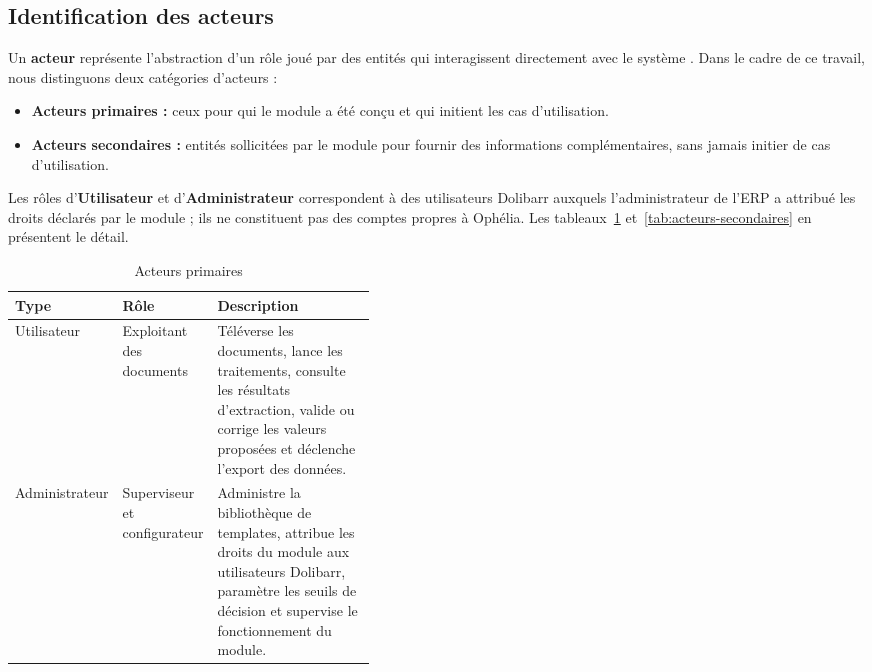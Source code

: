 \subsection{Identification des acteurs}
\label{subsec:acteurs}

Un \textbf{acteur} représente l'abstraction d'un rôle joué par des entités qui interagissent
directement avec le système \cite{roques2018uml}. Dans le cadre de ce travail, nous
distinguons deux catégories d'acteurs :

\begin{itemize}
    \item[\opmanicule] \textbf{Acteurs primaires :} ceux pour qui le module a été conçu et qui
    initient les cas d'utilisation.

    \item[\opmanicule] \textbf{Acteurs secondaires :} entités sollicitées par le module pour
    fournir des informations complémentaires, sans jamais initier de cas d'utilisation.
\end{itemize}

Les rôles d'\textbf{Utilisateur} et d'\textbf{Administrateur} correspondent à des utilisateurs
Dolibarr auxquels l'administrateur de l'ERP a attribué les droits déclarés par le module ; ils
ne constituent pas des comptes propres à Ophélia. Les tableaux~\ref{tab:acteurs-primaires}
et~\ref{tab:acteurs-secondaires} en présentent le détail.

\begin{table}[H]
    \centering
    \caption{Acteurs primaires}
    \label{tab:acteurs-primaires}
    \begin{tabularx}{\linewidth}{|p{0.20\linewidth}|p{0.22\linewidth}|X|}
        \hline
        \rowcolor[HTML]{FFCCCC}
        \textbf{Type} & \textbf{Rôle} & \textbf{Description} \\
        \hline
        Utilisateur & Exploitant des documents & Téléverse les documents, lance les
        traitements, consulte les résultats d'extraction, valide ou corrige les valeurs
        proposées et déclenche l'export des données. \\
        \hline
        Administrateur & Superviseur et configurateur & Administre la bibliothèque de
        templates, attribue les droits du module aux utilisateurs Dolibarr, paramètre les
        seuils de décision et supervise le fonctionnement du module. \\
        \hline
    \end{tabularx}
\end{table}

